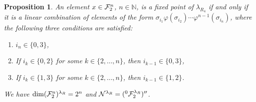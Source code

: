 \documentclass[12pt,a4paper]{amsart}
\numberwithin{equation}{section}
\newtheorem{proposition}[theorem]{Proposition}
\theoremstyle{remark}
\def\dim{\operatorname{dim}}
\def\N{\mathbb{N}}
\newcommand{\la}{\lambda}
\begin{document}
\begin{proposition}\label{prop:fixedpointsinexample}
 An element $x\in\mathcal{F}_2^n$, $n\in\N$, is a fixed point of $\la_{R_4}$ if and only if it is a linear combination of elements of the form $\sigma_{i_1}\varphi(\sigma_{i_2})\cdots\varphi^{n-1}(\sigma_{i_n})$, where the following three conditions are satisfied:
 \begin{enumerate}
  \item $i_n\in\{0,3\}$,
  \item If $i_k\in\{0,2\}$ for some $k\in\{2,\ldots,n\}$, then $i_{k-1}\in\{0,3\}$,
  \item If $i_k\in\{1,3\}$ for some $k\in\{2,\ldots,n\}$, then $i_{k-1}\in\{1,2\}$.
 \end{enumerate}
 We have $\dim(\CF_2^n)^{\la_R}=2^n$ and $\CN^{\la_R}=({}^0\CF_2^{\la_R})''$.
\end{proposition}
\end{document}
